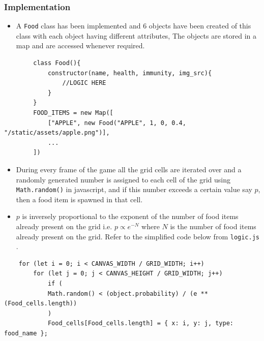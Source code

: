 \documentclass{article}
\begin{document}
    \subsubsection{Implementation}
    \begin{itemize}
        \item A \texttt{Food} class has been implemented and 6 objects have been created of this class with each object having different attributes, The objects are stored in a map and are accessed whenever required.
    \end{itemize}
    \begin{verbatim}
        class Food(){
            constructor(name, health, immunity, img_src){
                //LOGIC HERE
            }
        }
        FOOD_ITEMS = new Map([
            ["APPLE", new Food("APPLE", 1, 0, 0.4, "/static/assets/apple.png")],
            ...
        ])
    \end{verbatim}
    \begin{itemize}
        \item During every frame of the game all the grid cells are iterated over and a randomly generated number is assigned to each cell of the grid using \texttt{Math.random()} in javascript, and if this number exceeds a certain value say $p$, then a food item is spawned in that cell.
        \item $p$ is inversely proportional to the exponent of the number of food items already present on the grid i.e. $p \propto e^{-N}$ where $N$ is the number of food items already present on the grid. Refer to the simplified code below from \texttt{logic.js} .
        
    \end{itemize}
    \begin{verbatim}
    for (let i = 0; i < CANVAS_WIDTH / GRID_WIDTH; i++)
        for (let j = 0; j < CANVAS_HEIGHT / GRID_WIDTH; j++)
            if (
            Math.random() < (object.probability) / (e ** (Food_cells.length))
            )
            Food_cells[Food_cells.length] = { x: i, y: j, type: food_name };
  
    \end{verbatim}
    \vspace{0cm}
    
\end{document}
